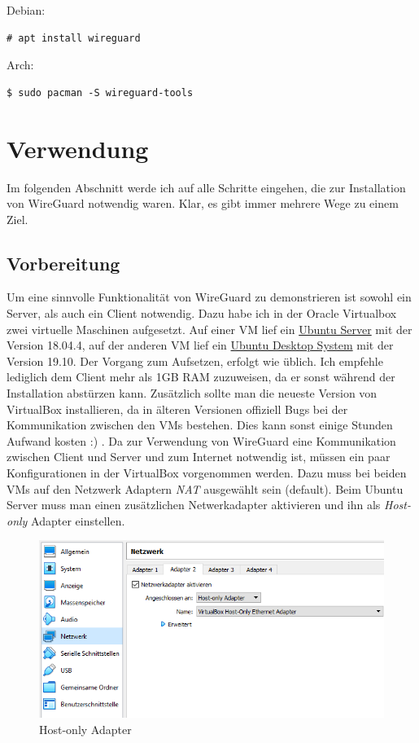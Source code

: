 \newpage  \noindent
Debian:
\begin{lstlisting}
# apt install wireguard
\end{lstlisting}
Arch:
\begin{lstlisting}
$ sudo pacman -S wireguard-tools
\end{lstlisting}

\section{Verwendung} %
Im folgenden Abschnitt werde ich auf alle Schritte eingehen, die zur Installation von WireGuard notwendig waren. Klar, es gibt immer mehrere Wege zu einem Ziel.
\subsection{Vorbereitung} 
\label{vorbereitung}
Um eine sinnvolle Funktionalität von WireGuard zu demonstrieren ist sowohl ein Server, als auch ein Client notwendig. Dazu habe ich in der Oracle Virtualbox zwei virtuelle Maschinen aufgesetzt. Auf einer VM lief ein \href{https://ubuntu.com/download/server}{Ubuntu Server} mit der Version 18.04.4, auf der anderen VM lief ein \href{https://ubuntu.com/download/desktop}{Ubuntu Desktop System} mit der Version 19.10. Der Vorgang zum Aufsetzen, erfolgt wie üblich. Ich empfehle lediglich dem Client mehr als 1GB RAM zuzuweisen, da er sonst während der Installation abstürzen kann. Zusätzlich sollte man die neueste Version von VirtualBox installieren, da in älteren Versionen offiziell Bugs bei der Kommunikation zwischen den VMs bestehen. Dies kann sonst einige Stunden Aufwand kosten :) .\newline
Da zur Verwendung von WireGuard eine Kommunikation zwischen Client und Server und zum Internet notwendig ist, müssen ein paar Konfigurationen in der VirtualBox vorgenommen werden. Dazu muss bei beiden VMs auf den Netzwerk Adaptern \textit{NAT} ausgewählt sein (default). Beim Ubuntu Server muss man einen zusätzlichen Netwerkadapter aktivieren und ihn als \textit{Host-only} Adapter einstellen. \newline
\begin{figure}[H]
  \centering
  \includegraphics[scale=0.75]{images/vm-nw.png}
  \caption{Host-only Adapter}
\end{figure} \noindent
